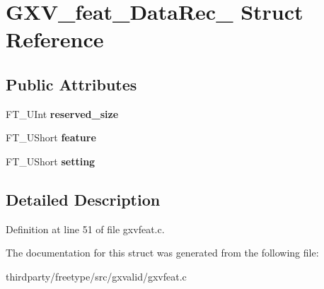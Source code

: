 \hypertarget{struct_g_x_v__feat___data_rec__}{}\section{G\+X\+V\+\_\+feat\+\_\+\+Data\+Rec\+\_\+ Struct Reference}
\label{struct_g_x_v__feat___data_rec__}
\subsection*{Public Attributes}
\begin{DoxyCompactItemize}
\item 
\mbox{\label{struct_g_x_v__feat___data_rec___a24f34b41b072ace68b9b216dd8b75303}} 
F\+T\+\_\+\+U\+Int {\bfseries reserved\+\_\+size}
\item 
\mbox{\label{struct_g_x_v__feat___data_rec___ae6e36ebe04e5672d57e1107023e13309}} 
F\+T\+\_\+\+U\+Short {\bfseries feature}
\item 
\mbox{\label{struct_g_x_v__feat___data_rec___afb79a6551af3a261d177dad82dcd57f1}} 
F\+T\+\_\+\+U\+Short {\bfseries setting}
\end{DoxyCompactItemize}


\subsection{Detailed Description}


Definition at line 51 of file gxvfeat.\+c.



The documentation for this struct was generated from the following file\+:\begin{DoxyCompactItemize}
\item 
thirdparty/freetype/src/gxvalid/gxvfeat.\+c\end{DoxyCompactItemize}
